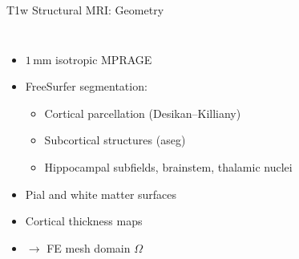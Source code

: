 \begin{frame}{T1w Structural MRI: Geometry}

  \begin{columns}[T]
    \begin{itemize}
      \item $1\,\text{mm}$ isotropic MPRAGE
      \item FreeSurfer segmentation:
      \begin{itemize}
        \item Cortical parcellation (Desikan--Killiany)
        \item Subcortical structures (aseg)
        \item Hippocampal subfields, brainstem, thalamic nuclei
      \end{itemize}
      \item Pial and white matter surfaces
      \item Cortical thickness maps
      \item $\to$ FE mesh domain $\Omega$
    \end{itemize}

    \begin{center}
    \end{center}
  \end{columns}

\end{frame}

